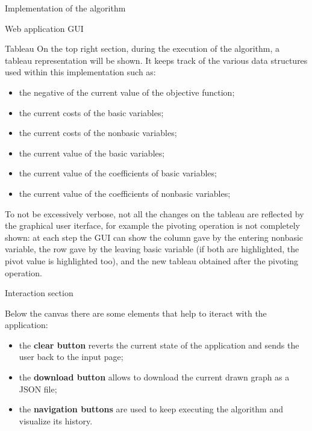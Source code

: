 \documentclass[9pt]{extarticle}
\begin{document}
\begin{section}{Implementation of the algorithm}
\begin{subsection}{Web application GUI}
            \begin{subsubsection}{Tableau}
                On the top right section, during the execution of the algorithm, a tableau representation will be shown.
                It keeps track of the various data structures used within this implementation such as:
                \begin{itemize}
                    \item the negative of the current value of the objective function;
                    \item the current costs of the basic variables;
                    \item the current costs of the nonbasic variables;
                    \item the current value of the basic variables;
                    \item the current value of the coefficients of basic variables;
                    \item the current value of the coefficients of nonbasic variables;
                \end{itemize}
                
                To not be excessively verbose, not all the changes on the tableau are reflected by the graphical user iterface, for example
                the pivoting operation is not completely shown: at each step the GUI can show the column gave by the entering nonbasic variable,
                the row gave by the leaving basic variable (if both are highlighted, the pivot value is highlighted too), and the new tableau obtained
                after the pivoting operation.
            \end{subsubsection}

            \begin{subsubsection}{Interaction section}
                \label{subsec:interaction}

                Below the canvas there are some elements that help to iteract with the application:
                \begin{itemize}
                    \item the \textbf{clear button} reverts the current state of the application and sends the user back to the input page;
                    \item the \textbf{download button} allows to download the current drawn graph as a JSON file;
                    \item the \textbf{navigation buttons} are used to keep executing the algorithm and visualize its history.
                \end{itemize}


\end{subsubsection}
\end{subsection}
\end{section}
\end{document}
